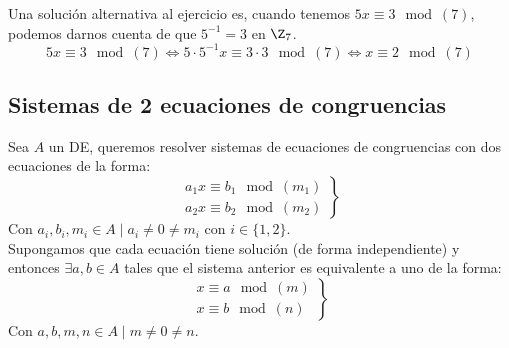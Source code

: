 \begin{ejemplo}
\begin{enumerate}
    \noindent Una solución alternativa al ejercicio es, cuando tenemos $5x\equiv 3\mod(7)$, podemos darnos cuenta de que $5^{-1} = 3$ en $\Z_7$.
    $$5x\equiv 3\mod(7) \Leftrightarrow 5\cdot 5^{-1}x\equiv 3\cdot 3\mod(7) \Leftrightarrow x\equiv 2 \mod(7)$$
\end{enumerate}
\end{ejemplo}

\subsection{Sistemas de 2 ecuaciones de congruencias}
\noindent Sea $A$ un DE, queremos resolver sistemas de ecuaciones de congruencias con dos ecuaciones de la forma:
$$\left. \begin{array}{l}
        a_1x\equiv b_1\mod(m_1) \\
        a_2x\equiv b_2\mod(m_2)
    \end{array} \right\}$$
Con $a_i,b_i,m_i \in A \mid a_i\neq 0 \neq m_i$ con $i \in \{1,2\}$.\\


\noindent Supongamos que cada ecuación tiene solución (de forma independiente) y entonces $\exists a,b \in A$ tales que el sistema
anterior es equivalente a uno de la forma:
$$\left. \begin{array}{l}
        x\equiv a\mod(m) \\
        x\equiv b\mod(n)
    \end{array} \right\}$$
Con $a,b,m,n \in A \mid m\neq0\neq n$.

